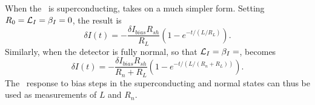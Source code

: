 When the \TES\ is superconducting,  takes on a much simpler form.
Setting $R_0 = \mathcal{L}_I = \beta_I = 0$, the result is
\begin{equation}\label{eqn:bias-step-resp-sc}
\delta I(t)
   = - \frac{\delta I_{bias} R_{sh}}{R_{L}} 
       \left(1 - e^{-t/(L/R_L)} \right).
\end{equation}
Similarly, when the detector is fully normal, so that $\mathcal{L}_I = \beta_I = $,  becomes
\begin{equation}\label{eqn:bias-step-resp-normal}
\delta I(t)
   = - \frac{\delta I_{bias} R_{sh}}{R_n + R_{L}} 
       \left(1 - e^{-t/(L/(R_n+R_L))} \right).
\end{equation}
The \TES\ response to bias steps in the superconducting and normal states can thus be used as measurements of $L$ and $R_n$.

